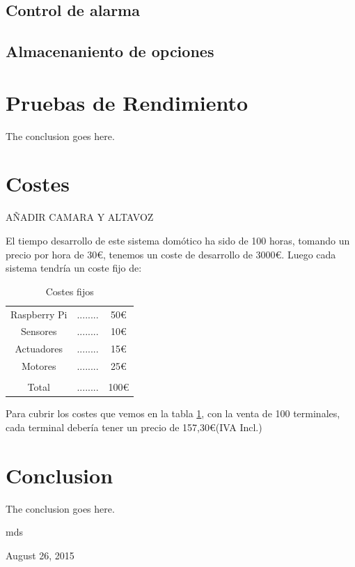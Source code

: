 \documentclass[10pt,journal,compsoc]{IEEEtran}
\begin{document}
\subsection{Control de alarma}

\subsection{Almacenaniento de opciones}

\section{Pruebas de Rendimiento}
The conclusion goes here.

\section{Costes}
AÑADIR CAMARA Y ALTAVOZ

El tiempo desarrollo de este sistema domótico ha sido de 100 horas, tomando un precio por hora de 30\euro, tenemos un coste de desarrollo de 3000\euro.
Luego cada sistema tendría un coste fijo de:

\begin{table}[h]
\centering
\begin{tabular}{ccc}
Raspberry Pi & ........ & 50\euro \\
Sensores & ........ & 10\euro \\
Actuadores & ........ & 15\euro \\
Motores & ........ & 25\euro \\
\hline \\
Total & ........ & 100\euro \\
\end{tabular} 
\caption{Costes fijos}
\label{tab:CostesFij}
\end{table}

Para cubrir los costes que vemos en la tabla \ref{tab:CostesFij}, con la venta de 100 terminales, cada terminal debería tener un precio de 157,30\euro (IVA Incl.)

\section{Conclusion}
The conclusion goes here.

\hfill mds
 
\hfill August 26, 2015

\end{document}
